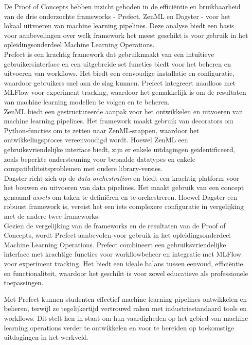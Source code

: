 De Proof of Concepts hebben inzicht geboden in de efficiëntie en bruikbaarheid van de drie onderzochte frameworks - Prefect, ZenML en Dagster - voor het lokaal uitvoeren van machine learning pipelines. Deze analyse biedt een basis voor aanbevelingen over welk framework het meest geschikt is voor gebruik in het opleidingsonderdeel Machine Learning Operations.\\

Prefect is een krachtig framework dat gebruikmaakt van een intuïtieve gebruikersinterface en een uitgebreide set functies biedt voor het beheren en uitvoeren van workflows. Het biedt een eenvoudige installatie en configuratie, waardoor gebruikers snel aan de slag kunnen. Prefect integreert naadloos met MLFlow voor experiment tracking, waardoor het gemakkelijk is om de resultaten van machine learning modellen te volgen en te beheren.\\

ZenML biedt een gestructureerde aanpak voor het ontwikkelen en uitvoeren van machine learning pipelines. Het framework maakt gebruik van decorators om Py\-thon-functies om te zetten naar ZenML-stappen, waardoor het ontwikkelingsproces vereenvoudigd wordt. Hoewel ZenML een gebruiksvriendelijke interface biedt, zijn er enkele uitdagingen geïdentificeerd, zoals beperkte ondersteuning voor bepaalde datatypes en enkele compatibiliteitsproblemen met oudere library-versies.\\

Dagster richt zich op de \textit{data orchestration} en biedt een krachtig platform voor het bouwen en uitvoeren van data pipelines. Het maakt gebruik van een concept genaamd \textit{assets} om taken te definiëren en te orchestreren. Hoewel Dagster een robuust framework is, vereist het een iets complexere configuratie in vergelijking met de andere twee frameworks.\\

Gezien de vergelijking van de frameworks en de resultaten van de Proof of Concepts, wordt Prefect aanbevolen voor gebruik in het opleidingsonderdeel Machine Learning Operations. Prefect combineert een gebruiksvriendelijke interface met krachtige functies voor workflowbeheer en integratie met MLFlow voor experiment tracking. Het biedt een ideale balans tussen eenvoud, efficiëntie en functionaliteit, waardoor het geschikt is voor zowel educatieve als professionele toepassingen.

Met Prefect kunnen studenten effectief machine learning pipelines ontwikkelen en beheren, terwijl ze tegelijkertijd vertrouwd raken met industriestandaard tools en workflows. Dit stelt hen in staat om hun vaardigheden op het gebied van machine learning operations verder te ontwikkelen en voor te bereiden op toekomstige uitdagingen in het werkveld.


